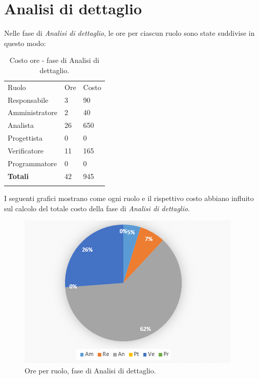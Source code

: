 \documentclass[a4paper]{report}
\begin{document}
		\section{Analisi di dettaglio}
			Nelle fase di \emph{Analisi di dettaglio}, le ore per ciascun ruolo sono state suddivise in questo modo:
			\begin{table}[H]
				\begin{tabularx}{\textwidth}{Y Y Y}
					Ruolo & Ore & Costo \\
					Responsabile & 3 & 90 \\
					Amministratore & 2 & 40 \\
					Analista & 26 & 650\\
					Progettista & 0 & 0\\
					Verificatore & 11 & 165\\
					Programmatore & 0 & 0 \\
					\textbf{Totali} & 42 & 945 \\
				\end{tabularx}
				\caption{Costo ore - fase di Analisi di dettaglio. } 
				\label{TCDettaglio}
			\end{table}
			I seguenti grafici mostrano come ogni ruolo e il rispettivo costo abbiano influito sul calcolo del totale 
			costo della fase di \emph{Analisi di dettaglio}.
			\begin{figure}[H]
				\centering
				\includegraphics[scale=0.7]{PCDettaglio}
				\caption{Ore per ruolo, fase di Analisi di dettaglio.}
			\end{figure}
\end{document}
